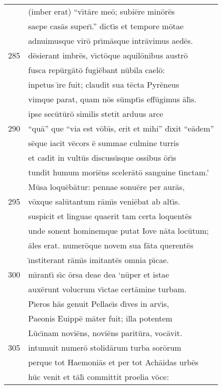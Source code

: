 \documentclass[paper=6in:9in,pagesize=pdftex,
               headinclude=on,footinclude=on,12pt]{scrbook}
\begin{document}
\begin{longtable}[p]{ r l }
 & (imber erat) ``v\={\i}t\=are me\=o; subi\=ere min\=or\=es\\ 
 & saepe cas\=as super\={\i}.'' dict\={\i}s et tempore m\=otae\\ 
 & adnuimusque vir\=o pr\={\i}m\=asque intr\=avimus aed\=es.\\ 
285 & d\=esierant imbr\=es, v\={\i}ct\=oque aquil\=onibus austr\=o\\ 
 & fusca rep\=urg\=at\=o fugi\=ebant n\=ubila cael\=o:\\ 
 & inpetus \={\i}re fuit; claudit sua t\=ecta Pyr\=eneus\\ 
 & vimque parat, quam n\=os s\=umpt\={\i}s eff\=ugimus \=al\={\i}s.\\ 
 & ipse sec\=ut\=ur\=o similis stetit arduus arce\\ 
290 & ``qu\=a'' que ``via est v\=ob\={\i}s, erit et mihi'' d\={\i}xit ``e\=adem''\\ 
 & s\=eque iacit v\=ecors \=e summae culmine turris\\ 
 & et cadit in vult\=us discuss\={\i}sque ossibus \=or\={\i}s\\ 
 & tundit humum mori\=ens sceler\=at\=o sanguine t\={\i}nctam.'\\ 
 & \indent M\=usa loqu\=eb\=atur: pennae sonu\=ere per aur\=as,\\ 
295 & v\=oxque sal\=utantum r\=am\={\i}s veni\=ebat ab alt\={\i}s.\\ 
 & suspicit et linguae quaerit tam certa loquent\=es\\ 
 & unde sonent hominemque putat Iove n\=ata loc\=utum;\\ 
 & \=ales erat. numer\=oque novem sua f\=ata querent\=es\\ 
 & \={\i}nstiterant r\=am\={\i}s imitant\=es omnia p\={\i}cae.\\ 
300 & m\={\i}rant\={\i} s\={\i}c \=orsa deae dea `n\=uper et istae\\ 
 & aux\=erunt volucrum v\={\i}ctae cert\=amine turbam.\\ 
 & P\={\i}eros h\=as genuit Pellae\={\i}s d\={\i}ves in arv\={\i}s,\\ 
 & Paeonis Euipp\=e m\=ater fuit; illa potentem\\ 
 & L\=uc\={\i}nam novi\=ens, novi\=ens parit\=ura, voc\=avit.\\ 
305 & intumuit numer\=o stolid\=arum turba sor\=orum\\ 
 & perque tot Haemoni\=as et per tot Ach\=aidas urb\=es\\ 
 & h\=uc venit et t\=al\={\i} committit proelia v\=oce:\\ 

\end{longtable}
\end{document}
